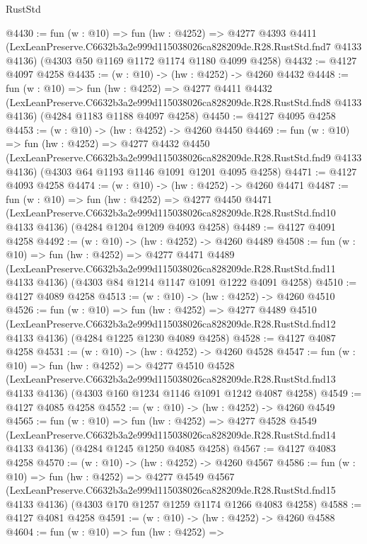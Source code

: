 \begin{lexlean}{RustStd}
\begin{coremodule}
@4430 := fun (w : @10) =>
  fun (hw : @4252) =>
  @4277
    @4393
    @4411
    (LexLeanPreserve.C6632b3a2e999d115038026ca828209de.R28.RustStd.fnd7 @4133 @4136)
    (@4303 @50 @1169 @1172 @1174 @1180 @4099 @4258)
@4432 := @4127 @4097 @4258
@4435 := (w : @10) -> (hw : @4252) -> @4260 @4432
@4448 := fun (w : @10) =>
  fun (hw : @4252) =>
  @4277
    @4411
    @4432
    (LexLeanPreserve.C6632b3a2e999d115038026ca828209de.R28.RustStd.fnd8 @4133 @4136)
    (@4284 @1183 @1188 @4097 @4258)
@4450 := @4127 @4095 @4258
@4453 := (w : @10) -> (hw : @4252) -> @4260 @4450
@4469 := fun (w : @10) =>
  fun (hw : @4252) =>
  @4277
    @4432
    @4450
    (LexLeanPreserve.C6632b3a2e999d115038026ca828209de.R28.RustStd.fnd9 @4133 @4136)
    (@4303 @64 @1193 @1146 @1091 @1201 @4095 @4258)
@4471 := @4127 @4093 @4258
@4474 := (w : @10) -> (hw : @4252) -> @4260 @4471
@4487 := fun (w : @10) =>
  fun (hw : @4252) =>
  @4277
    @4450
    @4471
    (LexLeanPreserve.C6632b3a2e999d115038026ca828209de.R28.RustStd.fnd10 @4133 @4136)
    (@4284 @1204 @1209 @4093 @4258)
@4489 := @4127 @4091 @4258
@4492 := (w : @10) -> (hw : @4252) -> @4260 @4489
@4508 := fun (w : @10) =>
  fun (hw : @4252) =>
  @4277
    @4471
    @4489
    (LexLeanPreserve.C6632b3a2e999d115038026ca828209de.R28.RustStd.fnd11 @4133 @4136)
    (@4303 @84 @1214 @1147 @1091 @1222 @4091 @4258)
@4510 := @4127 @4089 @4258
@4513 := (w : @10) -> (hw : @4252) -> @4260 @4510
@4526 := fun (w : @10) =>
  fun (hw : @4252) =>
  @4277
    @4489
    @4510
    (LexLeanPreserve.C6632b3a2e999d115038026ca828209de.R28.RustStd.fnd12 @4133 @4136)
    (@4284 @1225 @1230 @4089 @4258)
@4528 := @4127 @4087 @4258
@4531 := (w : @10) -> (hw : @4252) -> @4260 @4528
@4547 := fun (w : @10) =>
  fun (hw : @4252) =>
  @4277
    @4510
    @4528
    (LexLeanPreserve.C6632b3a2e999d115038026ca828209de.R28.RustStd.fnd13 @4133 @4136)
    (@4303 @160 @1234 @1146 @1091 @1242 @4087 @4258)
@4549 := @4127 @4085 @4258
@4552 := (w : @10) -> (hw : @4252) -> @4260 @4549
@4565 := fun (w : @10) =>
  fun (hw : @4252) =>
  @4277
    @4528
    @4549
    (LexLeanPreserve.C6632b3a2e999d115038026ca828209de.R28.RustStd.fnd14 @4133 @4136)
    (@4284 @1245 @1250 @4085 @4258)
@4567 := @4127 @4083 @4258
@4570 := (w : @10) -> (hw : @4252) -> @4260 @4567
@4586 := fun (w : @10) =>
  fun (hw : @4252) =>
  @4277
    @4549
    @4567
    (LexLeanPreserve.C6632b3a2e999d115038026ca828209de.R28.RustStd.fnd15 @4133 @4136)
    (@4303 @170 @1257 @1259 @1174 @1266 @4083 @4258)
@4588 := @4127 @4081 @4258
@4591 := (w : @10) -> (hw : @4252) -> @4260 @4588
@4604 := fun (w : @10) =>
  fun (hw : @4252) =>

\end{coremodule}
\end{lexlean}
